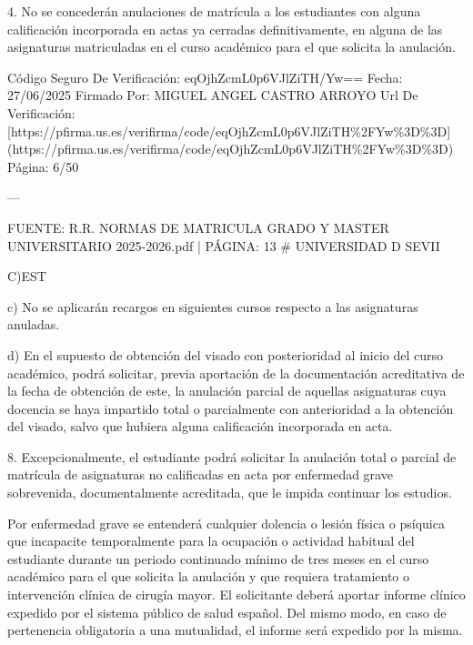\documentclass{article}
\begin{document}
\begin{itemize}
\begin{itemize}
\begin{scriptsize}
                  4. No se concederán anulaciones de matrícula a los estudiantes con alguna calificación incorporada en actas ya cerradas definitivamente, en alguna de las asignaturas matriculadas en el curso académico para el que solicita la anulación.

                  Código Seguro De Verificación: eqOjhZcmL0p6VJlZiTH/Yw==
                  Fecha: 27/06/2025
                  Firmado Por: MIGUEL ANGEL CASTRO ARROYO
                  Url De Verificación: [https://pfirma.us.es/verifirma/code/eqOjhZcmL0p6VJlZiTH\%2FYw\%3D\%3D](https://pfirma.us.es/verifirma/code/eqOjhZcmL0p6VJlZiTH\%2FYw\%3D\%3D)
                  Página: 6/50

                  ---

                  FUENTE: R.R. NORMAS DE MATRICULA GRADO Y MASTER UNIVERSITARIO 2025-2026.pdf | PÁGINA: 13
                  \# UNIVERSIDAD D SEVII

                  C)EST

                  c) No se aplicarán recargos en siguientes cursos respecto a las asignaturas anuladas.

                  d) En el supuesto de obtención del visado con posterioridad al inicio del curso académico, podrá solicitar, previa aportación de la documentación acreditativa de la fecha de obtención de este, la anulación parcial de aquellas asignaturas cuya docencia se haya impartido total o parcialmente con anterioridad a la obtención del visado, salvo que hubiera alguna calificación incorporada en acta.

                  8. Excepcionalmente, el estudiante podrá solicitar la anulación total o parcial de matrícula de asignaturas no calificadas en acta por enfermedad grave sobrevenida, documentalmente acreditada, que le impida continuar los estudios.

                  Por enfermedad grave se entenderá cualquier dolencia o lesión física o psíquica que incapacite temporalmente para la ocupación o actividad habitual del estudiante durante un periodo continuado mínimo de tres meses en el curso académico para el que solicita la anulación y que requiera tratamiento o intervención clínica de cirugía mayor. El solicitante deberá aportar informe clínico expedido por el sistema público de salud español. Del mismo modo, en caso de pertenencia obligatoria a una mutualidad, el informe será expedido por la misma.


\end{scriptsize}
\end{itemize}
\end{itemize}
\end{document}

